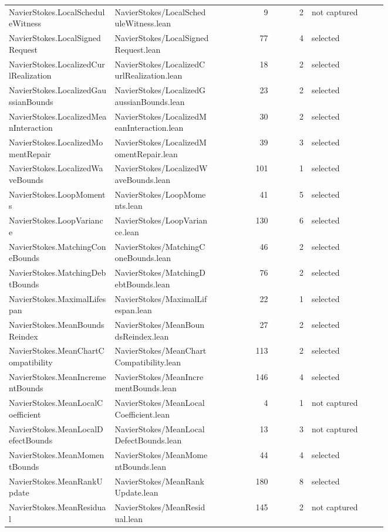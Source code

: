 \documentclass[10pt]{article}
\begin{document}
\begin{longtable}{p{0.28\linewidth}p{0.27\linewidth}r r p{0.20\linewidth}}
NavierStokes.LocalScheduleWitness & NavierStokes/LocalScheduleWitness.lean & 9 & 2 & not captured\\
NavierStokes.LocalSignedRequest & NavierStokes/LocalSignedRequest.lean & 77 & 4 & selected\\
NavierStokes.LocalizedCurlRealization & NavierStokes/LocalizedCurlRealization.lean & 18 & 2 & selected\\
NavierStokes.LocalizedGaussianBounds & NavierStokes/LocalizedGaussianBounds.lean & 23 & 2 & selected\\
NavierStokes.LocalizedMeanInteraction & NavierStokes/LocalizedMeanInteraction.lean & 30 & 2 & selected\\
NavierStokes.LocalizedMomentRepair & NavierStokes/LocalizedMomentRepair.lean & 39 & 3 & selected\\
NavierStokes.LocalizedWaveBounds & NavierStokes/LocalizedWaveBounds.lean & 101 & 1 & selected\\
NavierStokes.LoopMoments & NavierStokes/LoopMoments.lean & 41 & 5 & selected\\
NavierStokes.LoopVariance & NavierStokes/LoopVariance.lean & 130 & 6 & selected\\
NavierStokes.MatchingConeBounds & NavierStokes/MatchingConeBounds.lean & 46 & 2 & selected\\
NavierStokes.MatchingDebtBounds & NavierStokes/MatchingDebtBounds.lean & 76 & 2 & selected\\
NavierStokes.MaximalLifespan & NavierStokes/MaximalLifespan.lean & 22 & 1 & selected\\
NavierStokes.MeanBoundsReindex & NavierStokes/MeanBoundsReindex.lean & 27 & 2 & selected\\
NavierStokes.MeanChartCompatibility & NavierStokes/MeanChartCompatibility.lean & 113 & 2 & selected\\
NavierStokes.MeanIncrementBounds & NavierStokes/MeanIncrementBounds.lean & 146 & 4 & selected\\
NavierStokes.MeanLocalCoefficient & NavierStokes/MeanLocalCoefficient.lean & 4 & 1 & not captured\\
NavierStokes.MeanLocalDefectBounds & NavierStokes/MeanLocalDefectBounds.lean & 13 & 3 & not captured\\
NavierStokes.MeanMomentBounds & NavierStokes/MeanMomentBounds.lean & 44 & 4 & selected\\
NavierStokes.MeanRankUpdate & NavierStokes/MeanRankUpdate.lean & 180 & 8 & selected\\
NavierStokes.MeanResidual & NavierStokes/MeanResidual.lean & 145 & 2 & not captured\\

\end{longtable}
\end{document}
